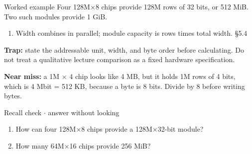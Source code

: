 \documentclass[11pt]{article}
\begin{document}
\begin{keepsection}
\begin{workedbox}{Worked example}
Four 128M\ensuremath{\times}8 chips provide 128M rows of 32 bits, or 512 MiB. Two such modules provide 1 GiB.

\begin{enumerate}
\item Width combines in parallel; module capacity is rows times total width. \hfill{\small\color{FAUblue}§5.4}
\end{enumerate}
\end{workedbox}

\begin{notebox}\textbf{Trap:} state the addressable unit, width, and byte order before calculating. Do not treat a qualitative lecture comparison as a fixed hardware specification.\end{notebox}

\begin{notebox}\textbf{Near miss:} a 1M \ensuremath{\times} 4 chip looks like 4 MB, but it holds 1M rows of 4 bits, which is 4 Mbit = 512 KB, because a byte is 8 bits. Divide by 8 before writing bytes.\end{notebox}

\begin{recallbox}{Recall check \ensuremath{\cdot} answer without looking}
\begin{enumerate}
\item How can four 128M\ensuremath{\times}8 chips provide a 128M\ensuremath{\times}32-bit module?
\item How many 64M\ensuremath{\times}16 chips provide 256 MiB?
\end{enumerate}

\end{recallbox}
\end{keepsection}
\end{document}
